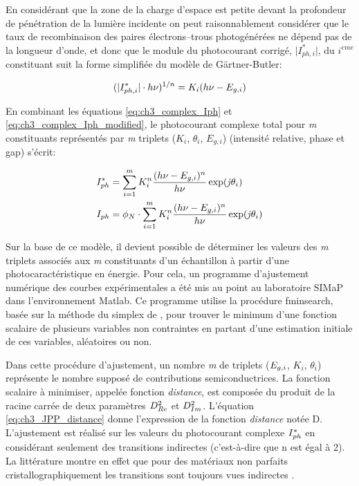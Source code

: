 \begin{refsection}
    En considérant que la zone de la charge d'espace est petite devant la profondeur de pénétration de la lumière
    incidente on peut raisonnablement considérer que le taux de recombinaison des paires électrons--trous photogénérées
    ne dépend pas de la longueur d'onde, et donc que le module du photocourant corrigé,
    $\vert I_{ph,i}^{\ast} \vert$, du $\mathit i^{eme}$ constituant suit la forme simplifiée du modèle de
    Gärtner-Butler:     
    
    \begin{equation}
        (\vert I_{ph,i}^{\ast} \vert \cdot h\nu)^{1/n} = K_i (h\nu - E _{g,i})
        \label{eq:ch3_complex_Iph_modified}
    \end{equation}

    \noindent En combinant les équations
    \ref{eq:ch3_complex_Iph} et \ref{eq:ch3_complex_Iph_modified}, le photocourant complexe total pour \emph{m}
    constituants représentés par \emph{m} triplets ($K_i$, $\theta _i$, $E_{g, i}$) 
    (intensité relative, phase et gap) s'écrit:
    
    \begin{equation}
        \begin{split}
            I_{ph}^{\ast} &= \sum  _{i=1}^{m} K_i^n \frac{(h\nu - E _{g,i})^n}{h\nu} \exp(\mathit{j}\theta _i) \\
            I_{ph} & = \phi _N \cdot \sum  _{i=1}^{m} K_i^n \frac{(h\nu - E _{g,i})^n}{h\nu} \exp(\mathit{j}\theta _i)
        \end{split}
        \label{eq:ch3_complex_Iph_fully_developped}
    \end{equation}

    Sur la base de ce modèle, il devient possible de déterminer les valeurs des \emph{m} triplets associés aux \emph{m}
    constituants d'un échantillon à partir d'une photocaractéristique en énergie.
    Pour cela, un programme d’ajustement numérique des courbes expérimentales
    a été mis au point au laboratoire SIMaP dans l’environnement Matlab\textregistered .
    Ce programme utilise la procédure fminsearch, basée sur la méthode du
    simplex de \citet{Lagarias1998}, pour trouver le minimum d’une fonction scalaire de plusieurs
    variables non contraintes en partant d’une estimation initiale de ces variables, aléatoires ou non.
    
    Dans cette procédure d’ajustement, un nombre \emph{m} de triplets ($E_{g,i}$, $K_i$, $\theta _i$) représente le nombre
    supposé de contributions semiconductrices. La fonction scalaire à minimiser, appelée fonction \emph{distance}, 
    est composée du produit de la racine carrée de deux paramètres $D^2_{Re}$  et $D^2_{Im}$.
    L'équation \ref{eq:ch3_JPP_distance} donne l'expression de la fonction
    \emph{distance} notée D. L'ajustement est réalisé sur les valeurs du photocourant complexe $I_{ph}^{\ast}$ en
    considérant seulement des transitions indirectes (c'est-à-dire que n est égal à 2). La littérature montre en effet
    que pour des matériaux non parfaits cristallographiquement les transitions sont toujours vues indirectes
    \citep{Stimming1986}.
    

\end{refsection}
